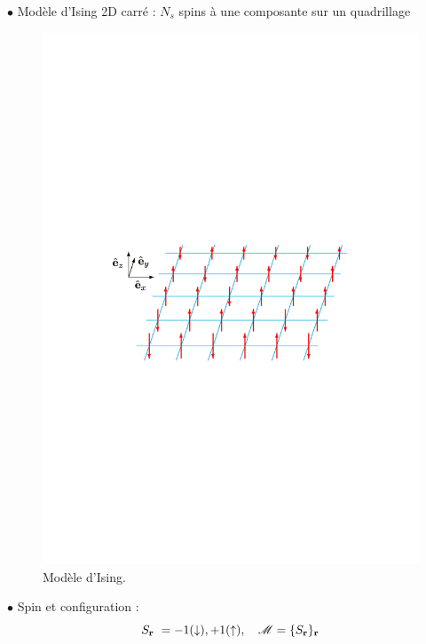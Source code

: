 \documentclass[9pt]{beamer}
\begin{document}
\setlength{\columnseprule}{0.4pt}
\begin{frame}
		\justifying
		\vspace*{22pt}


\begin{multicols}{2}

		$\bullet$ Modèle d'Ising 2D carré :
			$N_s$ spins à une composante sur un quadrillage
			\vspace*{-11pt}
			
\begin{figure}[H]
\begin{center}
\includegraphics[scale =0.35]{Ising2D.pdf}
\caption{Modèle d'Ising.}
	\label{fig:schemaIsing}
	\end{center}
\end{figure}

$\bullet$ Spin et configuration :
\begin{equation*}
 S_{\bf r} \ = -1(\downarrow), +1(\uparrow), \quad \mathscr{M} = \{S_{\bf r}\}_{\bf r}
\end{equation*}



\end{multicols}
\end{frame}
\end{document}
